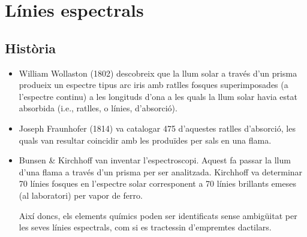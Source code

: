 \section{Línies espectrals}
\subsection{Història}
\begin{itemize}
	\item  William Wollaston (1802) descobreix que la llum solar a través d'un prisma produeix un espectre tipus arc iris amb ratlles fosques superimposades (a l'espectre continu) a les longituds d'ona a les quals la llum solar havia estat absorbida (i.e., ratlles, o línies, d'absorció).
	\item  Joseph Fraunhofer (1814) va catalogar 475 d'aquestes ratlles d'absorció, les quals van resultar coincidir amb les produïdes per sals en una flama.
	\item Bunsen \& Kirchhoff van inventar l'espectroscopi. Aquest fa passar la llum d'una flama a través d'un prisma per ser analitzada. Kirchhoff va determinar 70 línies fosques en l'espectre solar corresponent a 70 línies brillants emeses (al laboratori) per vapor de ferro.

	Així doncs, els elements químics poden ser identificats sense ambigüitat per les seves línies espectrals, com si es tractessin d'empremtes dactilars.
\end{itemize}

